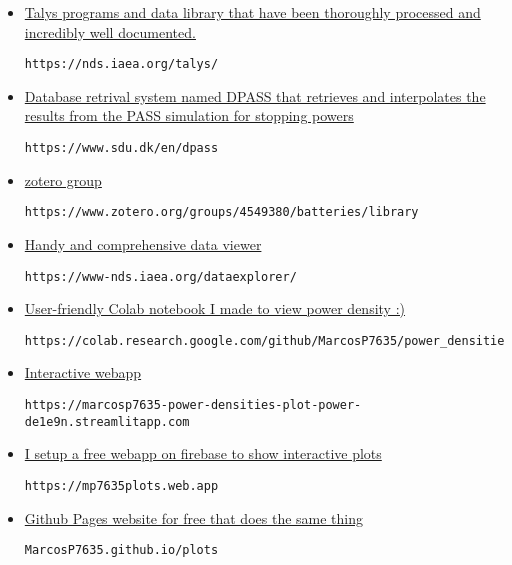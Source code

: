 \documentclass[12pt]{article}
\begin{document}
\begin{itemize}
\item \href{https://nds.iaea.org/talys/
}{Talys programs and data library that have been thoroughly processed and incredibly well documented.}
\begin{lstlisting}[breaklines]
https://nds.iaea.org/talys/
\end{lstlisting}


\item \href{https://www.sdu.dk/en/dpass
}{Database retrival system named DPASS that retrieves and interpolates the results from the PASS simulation for stopping powers}
\begin{lstlisting}[breaklines]
https://www.sdu.dk/en/dpass
\end{lstlisting}

\item \href{https://www.zotero.org/groups/4549380/batteries/library
}{zotero group}
\begin{lstlisting}[breaklines]
https://www.zotero.org/groups/4549380/batteries/library
\end{lstlisting}

\item \href{https://www-nds.iaea.org/dataexplorer/
}{Handy and comprehensive data viewer}
\begin{lstlisting}[breaklines]
https://www-nds.iaea.org/dataexplorer/
\end{lstlisting}

\item \href{https://colab.research.google.com/github/MarcosP7635/power_densities/blob/main/Plot_power.ipynb
}{User-friendly Colab notebook I made to view power density :)}
\begin{lstlisting}[breaklines]
https://colab.research.google.com/github/MarcosP7635/power_densities/blob/main/Plot_power.ipynb
\end{lstlisting}

\item \href{https://marcosp7635-power-densities-plot-power-de1e9n.streamlitapp.com/}{Interactive webapp}
\begin{lstlisting}[breaklines]
https://marcosp7635-power-densities-plot-power-de1e9n.streamlitapp.com
\end{lstlisting}

\item \href{https://mp7635plots.web.app}{I setup a free webapp on firebase to show interactive plots}
\begin{lstlisting}[breaklines]
https://mp7635plots.web.app
\end{lstlisting}

\item \href{https://MarcosP7635.github.io/plots}{Github Pages website for free that does the same thing}
\begin{lstlisting}[breaklines]
MarcosP7635.github.io/plots
\end{lstlisting}

\end{itemize}
\end{document}
